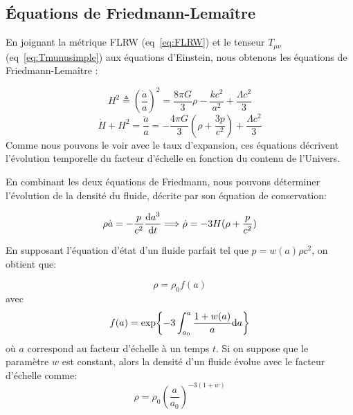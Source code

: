 \documentclass[../main/main.tex]{subfiles}
\begin{document}
\subsection{\'Equations de Friedmann-Lemaître}

En joignant la métrique FLRW (eq~\ref{eq:FLRW}) et le tenseur
$T_{\mu\nu}$ (eq~\ref{eq:Tmunusimple}) aux équations d'Einstein, nous
obtenons les équations de Friedmann-Lemaître \citep{Friedmann1922}:

\begin{equation}
  \label{eq:Friedmann1}
  H^{2}\triangleq\left(\frac{\dot{a}}{a}\right)^{2}=\frac{8\pi
    G}{3}\rho-\frac{kc^{2}}{a^{2}}+\frac{\Lambda c^{2}}{3}
\end{equation}
\begin{equation}
  \label{eq:Friedmann2}
  \dot{H}+H^{2}=\frac{\ddot{a}}{a}=-\frac{4\pi
    G}{3}(\rho+\frac{3p}{c^{2}})+\frac{\Lambda c^{2}}{3}
\end{equation}
Comme nous pouvons le voir avec le taux d'expansion, ces équations
décrivent l'évolution temporelle du facteur d'échelle en fonction du
contenu de l'Univers.

En combinant les deux équations de Friedmann, nous pouvons déterminer
l'évolution de la densité du fluide, décrite par son équation de
conservation:

\begin{equation}
  \label{eq:conservationdensity}
  \rho \dot{a} = -\frac{p}{c^{2}}\frac{\mathrm{d} a^{3}}{\mathrm{d} t} \Longrightarrow
  \dot{\rho}=-3H(\rho+\frac{p}{c^{2}})
\end{equation}

En supposant l'équation d'état d'un fluide parfait tel que $p=w(a)\rho
c^{2}$, on obtient que:

\begin{equation}
  \label{eq:30}
  \rho=\rho_{0}f(a)
\end{equation}
avec
\begin{equation}
  \label{eq:31}
  f(a)=\exp{-3\int_{a_{0}}^{a}\frac{1+w(a)}{a}\mathrm{d}a}
\end{equation}
où $a$ correspond au facteur d'échelle à un temps $t$. Si on suppose que
le paramètre $w$ est constant, alors la densité d'un fluide évolue avec
le facteur d'échelle comme:
\begin{equation}
  \label{eq:rhoevol}
  \rho=\rho_{0}\left(\frac{a}{a_{0}}\right)^{-3(1+w)}
\end{equation}
\end{document}
